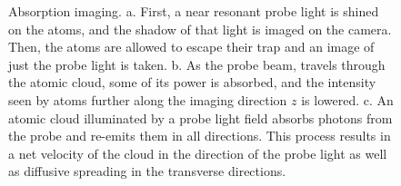 \documentclass[12pt]{iopart}
\begin{document}
\begin{figure}
\caption{Absorption imaging. a. First, a near resonant probe light is shined on the atoms, and the shadow of that light is imaged on the camera. Then, the atoms are allowed to escape their trap and an image of just the probe light is taken. b.  As the probe beam, travels through the atomic cloud, some of its power is absorbed, and the intensity seen by atoms further along the imaging direction $z$ is lowered.  c. An atomic cloud illuminated by a probe light field absorbs photons from the probe and re-emits them in all directions. This process results in a net velocity of the cloud in the direction of the probe light as well as diffusive spreading in the transverse directions.  }  
\label{fig:absorptionIntor}
\end{figure}
\end{document}
